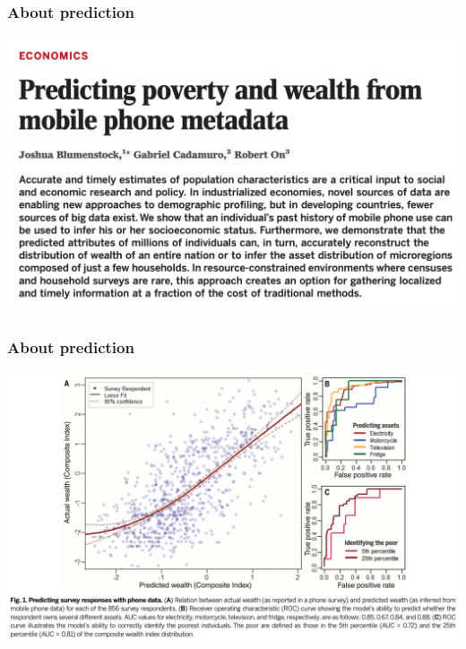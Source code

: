 \documentclass[aspectratio=43]{beamer}
\begin{document}
\begin{frame}
\frametitle{About prediction}
\centering

\includegraphics[width = \textwidth]{../img/blumenstock}

\end{frame}

\begin{frame}
\frametitle{About prediction}
\centering

\includegraphics[width = \textwidth]{../img/blumenstock2}

\end{frame}
\end{document}
